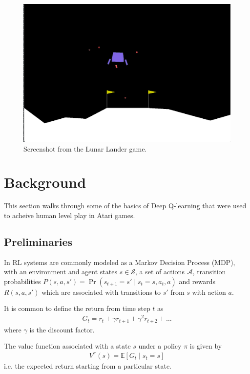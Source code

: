 \documentclass{article}
\begin{document}
\begin{figure}
  \includegraphics[width=\linewidth]{images/screenshot.png}
  \caption{Screenshot from the Lunar Lander game.}
  \label{fig:screenshot}
\end{figure}

\section{Background}
\label{background}
This section walks through some of the basics of Deep Q-learning that were used to acheive human level play in Atari games.

\subsection{Preliminaries}
In RL systems are commonly modeled as a Markov Decision Process (MDP), with an environment and agent states $s \in \mathcal{S}$, a set of actions $\mathcal{A}$, transition probabilities $P(s, a, s') = \Pr(s_{t+1} = s' \mid s_t = s, a_t, a)$ and rewards $R(s, a, s')$ which are associated with transitions to $s'$ from $s$ with action $a$.

It is common to define the return from time step $t$ as
\begin{align*}
  G_t = r_t + \gamma r_{t+1} + \gamma^2 r_{t+2} + \hdots
\end{align*}
where $\gamma$ is the discount factor.

The value function associated with a state $s$ under a policy $\pi$ is given by
\begin{align*}
  V^\pi (s) = \mathbb{E}[G_t \mid s_t = s]
\end{align*}
i.e. the expected return starting from a particular state.
\end{document}
